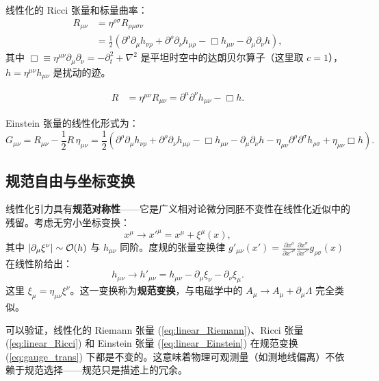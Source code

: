 线性化的 Ricci 张量和标量曲率：
\begin{align}
    R_{\mu\nu} &= \eta^{\rho\sigma}R_{\rho\mu\sigma\nu} \nonumber\\
    &= \frac{1}{2}\left(\partial^\rho\partial_\mu h_{\nu\rho} + \partial^\rho\partial_\nu h_{\mu\rho} - \Box h_{\mu\nu} - \partial_\mu\partial_\nu h\right),
    \label{eq:linear_Ricci}
\end{align}
其中 $\Box \equiv \eta^{\mu\nu}\partial_\mu\partial_\nu = -\partial_t^2 + \nabla^2$ 是平坦时空中的达朗贝尔算子（这里取 $c=1$），$h = \eta^{\mu\nu}h_{\mu\nu}$ 是扰动的迹。

\begin{align}
    R &= \eta^{\mu\nu}R_{\mu\nu} = \partial^\mu\partial^\nu h_{\mu\nu} - \Box h.
    \label{eq:linear_Rscalar}
\end{align}

Einstein 张量的线性化形式为：
\begin{equation}
    G_{\mu\nu} = R_{\mu\nu} - \frac{1}{2}R\,\eta_{\mu\nu}
    = \frac{1}{2}\left(\partial^\rho\partial_\mu h_{\nu\rho} + \partial^\rho\partial_\nu h_{\mu\rho} - \Box h_{\mu\nu} - \partial_\mu\partial_\nu h - \eta_{\mu\nu}\partial^\rho\partial^\sigma h_{\rho\sigma} + \eta_{\mu\nu}\Box h\right).
    \label{eq:linear_Einstein}
\end{equation}

\subsection{规范自由与坐标变换}

线性化引力具有\textbf{规范对称性}——它是广义相对论微分同胚不变性在线性化近似中的残留。考虑无穷小坐标变换：
\begin{equation}
    x^\mu \to x'^\mu = x^\mu + \xi^\mu(x),
\end{equation}
其中 $|\partial_\mu\xi^\nu| \sim \mathcal{O}(h)$ 与 $h_{\mu\nu}$ 同阶。度规的张量变换律 $g'_{\mu\nu}(x') = \frac{\partial x^\rho}{\partial x'^\mu}\frac{\partial x^\sigma}{\partial x'^\nu} g_{\rho\sigma}(x)$ 在线性阶给出：
\begin{equation}
    \boxed{h_{\mu\nu} \to h'_{\mu\nu} = h_{\mu\nu} - \partial_\mu\xi_\nu - \partial_\nu\xi_\mu}.
    \label{eq:gauge_trans}
\end{equation}
这里 $\xi_\mu = \eta_{\mu\nu}\xi^\nu$。这一变换称为\textbf{规范变换}，与电磁学中的 $A_\mu \to A_\mu + \partial_\mu\Lambda$ 完全类似。

\begin{note}[规范不变性]
可以验证，线性化的 Riemann 张量 (\ref{eq:linear_Riemann})、Ricci 张量 (\ref{eq:linear_Ricci}) 和 Einstein 张量 (\ref{eq:linear_Einstein}) 在规范变换 (\ref{eq:gauge_trans}) 下都是不变的。这意味着物理可观测量（如测地线偏离）不依赖于规范选择——规范只是描述上的冗余。
\end{note}

